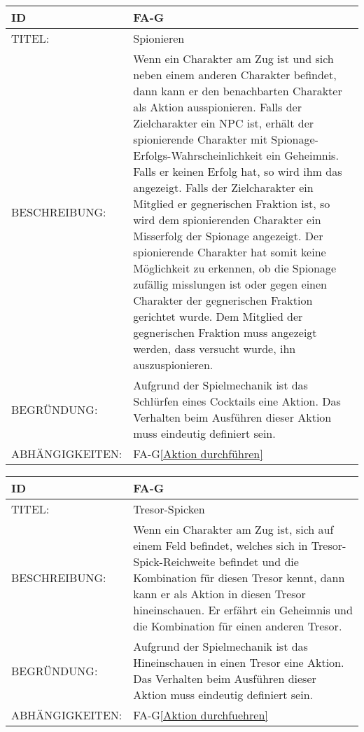 \begin{tabularx}{16cm}{l|X}
	{table}\label{Spionieren}
	\textbf{ID} & \textbf{FA-G\arabic{table}} \\
	\hline
	TITEL: & Spionieren \\
	\hline
	BESCHREIBUNG: & Wenn ein Charakter am Zug ist und sich neben einem anderen Charakter befindet, dann kann er den benachbarten Charakter als Aktion ausspionieren. Falls der Zielcharakter ein NPC ist, erhält der spionierende Charakter mit Spionage-Erfolgs-Wahrscheinlichkeit ein Geheimnis. Falls er keinen Erfolg hat, so wird ihm das angezeigt.
	Falls der Zielcharakter ein Mitglied er gegnerischen Fraktion ist, so wird dem spionierenden Charakter ein Misserfolg der Spionage angezeigt. Der spionierende Charakter hat somit keine Möglichkeit zu erkennen, ob die Spionage zufällig misslungen ist oder gegen einen Charakter der gegnerischen Fraktion gerichtet wurde. Dem Mitglied der gegnerischen Fraktion muss angezeigt werden, dass versucht wurde, ihn auszuspionieren.\\
	 
	\hline
	BEGRÜNDUNG: & Aufgrund der Spielmechanik ist das Schlürfen eines Cocktails eine Aktion. Das Verhalten beim Ausführen dieser Aktion muss eindeutig definiert sein.\\
	\hline
	ABHÄNGIGKEITEN: & FA-G\ref{Aktion durchführen}  \todo[inline]{2.8.1 Wahlphase}\\
\end{tabularx}

\begin{tabularx}{16cm}{l|X}
	{table}\label{Tresor-Spicken}
	\textbf{ID} & \textbf{FA-G\arabic{table}} \\
	\hline
	TITEL: & Tresor-Spicken \\
	\hline
	BESCHREIBUNG: & Wenn ein Charakter am Zug ist, sich auf einem Feld befindet, welches sich in Tresor-Spick-Reichweite befindet und die Kombination für diesen Tresor kennt, dann kann er als Aktion in diesen Tresor hineinschauen. Er erfährt ein Geheimnis und die Kombination für einen anderen Tresor.\\
	 
	\hline
	BEGRÜNDUNG: & Aufgrund der Spielmechanik ist das Hineinschauen in einen Tresor eine Aktion. Das Verhalten beim Ausführen dieser Aktion muss eindeutig definiert sein.\\
	\hline
	ABHÄNGIGKEITEN: & FA-G\ref{Aktion durchfuehren}  \todo[inline]{2.8.1 Wahlphase}\\
\end{tabularx}

